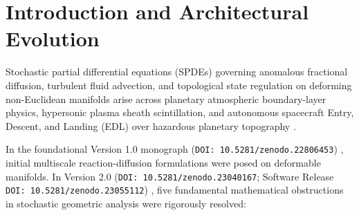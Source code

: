 \documentclass[11pt,a4paper,reqno]{article}
\theoremstyle{definition}
\theoremstyle{remark}
\begin{document}
\section{Introduction and Architectural Evolution}

Stochastic partial differential equations (SPDEs) governing anomalous fractional diffusion, turbulent fluid advection, and topological state regulation on deforming non-Euclidean manifolds arise across planetary atmospheric boundary-layer physics, hypersonic plasma sheath scintillation, and autonomous spacecraft Entry, Descent, and Landing (EDL) over hazardous planetary topography \cite{ananda2026spde_v25, ananda2026stochastic_fluid_v2, ghulame2026spde_v1, daPrato2014stochastic, kunita1990stochastic}.

In the foundational Version 1.0 monograph (\texttt{DOI: 10.5281/zenodo.22806453}) \cite{ghulame2026spde_v1}, initial multiscale reaction-diffusion formulations were posed on deformable manifolds. In Version 2.0 (\texttt{DOI: 10.5281/zenodo.23040167}; Software Release \texttt{DOI: 10.5281/zenodo.23055112}) \cite{ananda2026stochastic_fluid_v2, ananda2026stochastic_fluid_v2_software}, five fundamental mathematical obstructions in stochastic geometric analysis were rigorously resolved:
\end{document}
